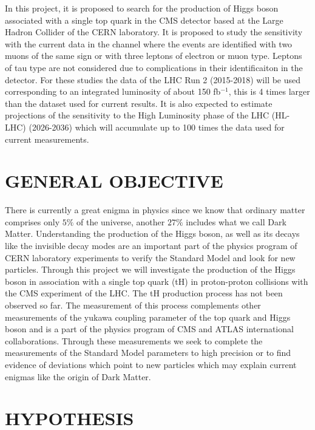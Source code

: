 \documentclass[final,3p]{CSP}
\begin{document}
In this project, it is proposed to search for the production of Higgs boson associated with a single top quark in the CMS detector based at the Large Hadron Collider of the CERN laboratory.
It is proposed to study the sensitivity with the current data in the channel where the events are identified with two muons of the same sign or with three leptons of electron or muon type.
Leptons of tau type are not considered due to complications in their identificaiton in the detector.
For these studies the data of the LHC Run 2 (2015-2018) will be used corresponding to an integrated luminosity of about 150 fb$^{-1}$, this is 4 times larger than the dataset used for current results.
It is also expected to estimate projections of the sensitivity to the High Luminosity phase of the LHC (HL-LHC) (2026-2036) which will accumulate up to 100 times the data used for current measurements. 


\section{GENERAL OBJECTIVE}


There is currently a great enigma in physics since we know that ordinary matter comprises only $5\%$ of the universe, another  $27\%$ includes what we call Dark Matter.
Understanding the production of the Higgs boson, as well as its decays like the invisible decay modes are an important part of the physics program of CERN laboratory experiments to verify the Standard Model and look for new particles.
Through this project we will investigate the production of the Higgs boson in association with a single top quark (tH) in proton-proton collisions with the CMS experiment of the LHC.
The tH  production process has not been observed so far.
The measurement  of this process complements other measurements of the yukawa coupling parameter of the top  quark and Higgs boson and is a part of the physics program of CMS  and ATLAS international collaborations.
Through these measurements we seek to complete the measurements of the Standard Model parameters to high precision or to find evidence of deviations which point to new particles which may explain current enigmas like the origin of Dark Matter.


\section{HYPOTHESIS}
\end{document}
